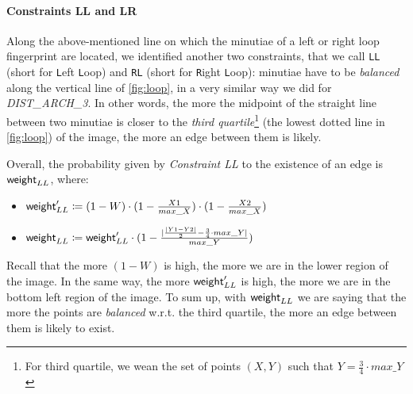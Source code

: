 \documentclass[8pt]{article}
\begin{document}
\paragraph{Constraints LL and LR}
Along the above-mentioned line on which the minutiae of a left or right loop
fingerprint are located, we identified another two constraints, that we call
\texttt{LL} (short for \texttt{L}eft \texttt{L}oop) and \texttt{RL} (short for
\texttt{R}ight \texttt{L}oop): minutiae have to be \emph{balanced} along the
vertical line of \cref{fig:loop}, in a very similar way we did for
\emph{DIST\_ARCH\_3}. In other words, the more the midpoint of the straight line between
two minutiae is closer to the \emph{third quartile}\footnote{For third
quartile, we wean the set of points $(X,Y)$ such that $Y=\frac{3}{4}\cdot
max\_Y$} (the lowest dotted line in \cref{fig:loop}) of the image, the more an edge between them is likely.

Overall, the probability given by \emph{Constraint LL} to the existence of an
edge is $\textsf{weight}_{LL}$, where:
  \begin{itemize}
    \item
      $\textsf{weight}_{LL}^\prime \coloneqq 
        (1-W) \cdot (1-\frac{X1}{max\_X}) \cdot (1-\frac{X2}{max\_X})$ 
    \item
      $\textsf{weight}_{LL} \coloneqq
        \textsf{weight}_{LL}^\prime \cdot (1-
        \frac{\lvert \frac{\lvert Y1-Y2 \rvert}{2} - \frac{3}{4}\cdot max\_Y
        \rvert}{max\_Y})$
  \end{itemize}
Recall that the more $(1-W)$ is high, the more we are in the lower region of
the image. In the same way, the more $\textsf{weight}_{LL}^\prime$ is high, the more we
are in the bottom left region of the image.  To sum up, with $\textsf{weight}_{LL}$ we
are saying that the more the points are \emph{balanced} w.r.t. the third
quartile, the more an edge between them is likely to exist.
\end{document}
